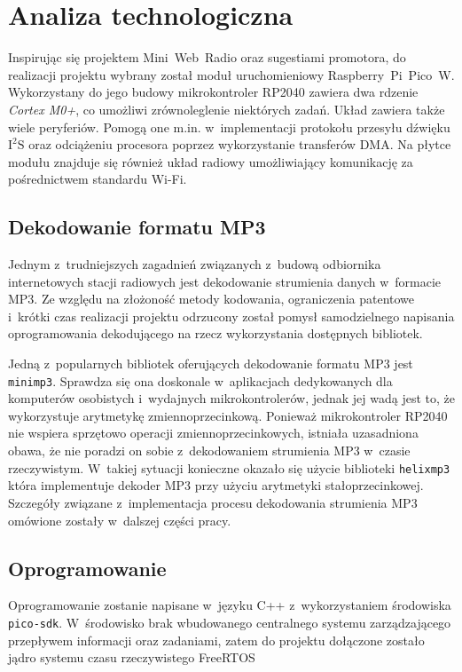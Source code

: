 \documentclass[polish]{aghengthesis}
\newcommand{\isqs}{$\text{I}^{2}\text{S}$}
\begin{document}
	\section{Analiza technologiczna}
		Inspirując się projektem Mini~Web~Radio oraz sugestiami promotora, do realizacji projektu wybrany został moduł uruchomieniowy Raspberry~Pi~Pico~W.
		Wykorzystany do jego budowy mikrokontroler RP2040\textsuperscript{\cite{rp2040}} zawiera dwa rdzenie \textit{Cortex M0+}, co umożliwi zrównoleglenie niektórych zadań.
		Układ zawiera także wiele peryferiów. Pomogą one m.in. w~implementacji protokołu przesyłu dźwięku \isqs{} oraz odciążeniu procesora poprzez wykorzystanie transferów DMA. Na płytce modułu znajduje się również układ radiowy umożliwiający komunikację za pośrednictwem standardu Wi-Fi.
		
		\subsection{Dekodowanie formatu MP3}
			Jednym z~trudniejszych zagadnień związanych z~budową odbiornika internetowych stacji radiowych jest dekodowanie strumienia danych w~formacie MP3. Ze względu na złożoność metody kodowania, ograniczenia patentowe i~krótki czas realizacji projektu odrzucony został pomysł samodzielnego napisania oprogramowania dekodującego na rzecz wykorzystania dostępnych bibliotek.
			
			Jedną z~popularnych bibliotek oferujących dekodowanie formatu MP3 jest \lstinline|minimp3|\textsuperscript{\cite{minimp3}}. Sprawdza się ona doskonale w~aplikacjach dedykowanych dla komputerów osobistych i~wydajnych mikrokontrolerów, jednak jej wadą jest to, że wykorzystuje arytmetykę zmiennoprzecinkową. Ponieważ mikrokontroler RP2040 nie wspiera sprzętowo operacji zmiennoprzecinkowych, istniała uzasadniona obawa, że nie poradzi on sobie z~dekodowaniem strumienia MP3 w~czasie rzeczywistym. W~takiej sytuacji konieczne okazało się użycie  biblioteki \lstinline|helixmp3|\textsuperscript{\cite{helixmp3_repo}} która implementuje dekoder MP3 przy użyciu arytmetyki stałoprzecinkowej.
			$ $\\
			
			Szczegóły związane z~implementacja procesu dekodowania strumienia MP3 omówione zostały w~dalszej części pracy.
		
		\subsection{Oprogramowanie}
			Oprogramowanie zostanie napisane w~języku C++ z~wykorzystaniem środowiska \lstinline|pico-sdk|\textsuperscript{\cite{pico_sdk}}.  W~środowisko brak wbudowanego centralnego systemu zarządzającego przepływem informacji oraz zadaniami, zatem do projektu dołączone zostało jądro systemu czasu rzeczywistego FreeRTOS\textsuperscript{\cite{freertos_kernel}}
	
\end{document}
